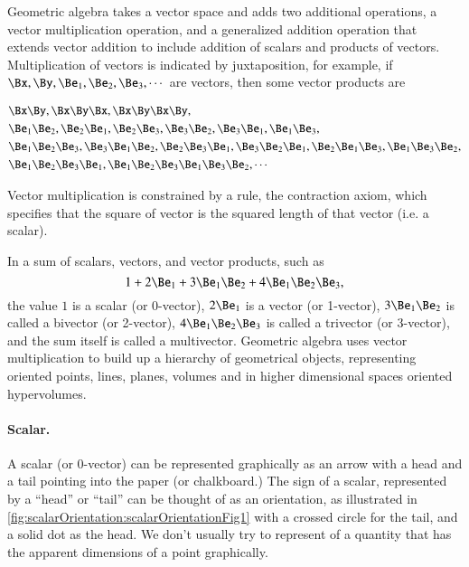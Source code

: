 %
%
Geometric algebra takes a vector space and adds two additional operations, a vector multiplication operation, and a generalized addition operation that extends vector addition to include addition of scalars and products of vectors.
Multiplication of vectors is indicated by juxtaposition, for example, if \( \Bx, \By, \Be_1, \Be_2, \Be_3, \cdots \) are vectors, then some vector products are

\begin{dmath}\label{eqn:multivector:20}
\begin{aligned}
&\Bx \By, \Bx \By \Bx, \Bx \By \Bx \By, \\
&\Be_1 \Be_2, \Be_2 \Be_1, \Be_2 \Be_3, \Be_3 \Be_2, \Be_3 \Be_1, \Be_1 \Be_3, \\
&\Be_1 \Be_2 \Be_3, \Be_3 \Be_1 \Be_2, \Be_2 \Be_3 \Be_1, \Be_3 \Be_2 \Be_1, \Be_2 \Be_1 \Be_3, \Be_1 \Be_3 \Be_2, \\
&\Be_1 \Be_2 \Be_3 \Be_1, \Be_1 \Be_2 \Be_3 \Be_1 \Be_3 \Be_2, \cdots
\end{aligned}
\end{dmath}

Vector multiplication is constrained by a rule, the contraction axiom, which specifies that the square of vector is the squared length of that vector (i.e. a scalar).

In a sum of scalars, vectors, and vector products, such as
\begin{dmath}\label{eqn:multivector:40}
1 + 2 \Be_1 + 3 \Be_1 \Be_2 + 4 \Be_1 \Be_2 \Be_3,
\end{dmath}
the value \( 1 \) is a scalar (or 0-vector), \( 2 \Be_1 \) is a vector (or 1-vector),
\( 3 \Be_1 \Be_2 \) is called a bivector (or 2-vector), \( 4 \Be_1 \Be_2 \Be_3 \) is called a trivector (or 3-vector), and the sum itself is called a multivector.
Geometric algebra uses vector multiplication to build up a hierarchy of geometrical objects, representing oriented points, lines, planes, volumes and in higher dimensional spaces oriented hypervolumes.

\paragraph{Scalar.}
A scalar (or 0-vector) can be represented graphically as an arrow with a head and a tail pointing into the paper (or chalkboard.)
The sign of a scalar, represented by a ``head'' or ``tail'' can be thought of as an orientation, as illustrated in
\cref{fig:scalarOrientation:scalarOrientationFig1} with a crossed circle for the tail, and a solid dot as the head.
We don't usually try to represent of a quantity that has the apparent dimensions of a point graphically.

